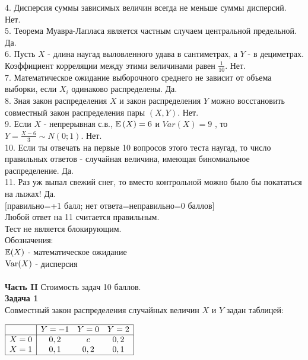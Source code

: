 \documentclass[12pt, a4paper]{article}\usepackage[]{graphicx}\usepackage[]{color}
\begin{document}
4. Дисперсия суммы зависимых величин всегда не меньше суммы
дисперсий. Нет. \\

5. Теорема Муавра-Лапласа является частным случаем центральной
предельной. Да. \\

6. Пусть $X$ - длина наугад выловленного удава в сантиметрах, а
$Y$ - в дециметрах. Коэффициент корреляции между этими
величинами равен $\frac{1}{10}$. Нет. \\

7. Математическое ожидание выборочного среднего не зависит от
объема выборки, если $X_{i}$ одинаково распределены. Да. \\

8. Зная закон распределения $X$ и закон распределения $Y$
можно восстановить совместный закон распределения пары $(X,Y)$. Нет. \\

9. Если  $X$  - непрерывная с.в.,  $\mathbb{E}\left(X\right)=6$  и
$Var\left(X\right)=9$ , то  $Y=\frac{X-6}{3} \sim
N\left(0;1\right)$.  Нет. \\

10. Если ты отвечать на первые 10 вопросов этого теста наугад, то
число правильных ответов - случайная величина, имеющая
биномиальное распределение. Да. \\

11. Раз уж выпал свежий снег, то вместо контрольной можно
было бы покататься на лыжах! Да. \\


$[$правильно=+1 балл; нет ответа=неправильно=0 баллов$]$ \\
Любой ответ на 11 считается правильным. \\
Тест не является блокирующим. \\
Обозначения: \\
$\mathbb{E}(X)$ - математическое ожидание \\
$\operatorname{Var}(X)$ - дисперсия \\ \\


\textbf{Часть II} Стоимость задач 10 баллов. \\


\textbf{Задача 1} \\ %
Совместный закон распределения случайных величин  $X$  и  $Y$
задан таблицей:

$\begin{array}{|c|ccc|}
\hline
{} & {Y=-1} & {Y=0} & {Y=2}\\
\hline
{X=0} & {0,2} & {c} & {0,2}\\
{X=1} & {0,1} & {0,2} & {0,1} \\
\hline
\end{array}$
\end{document}
